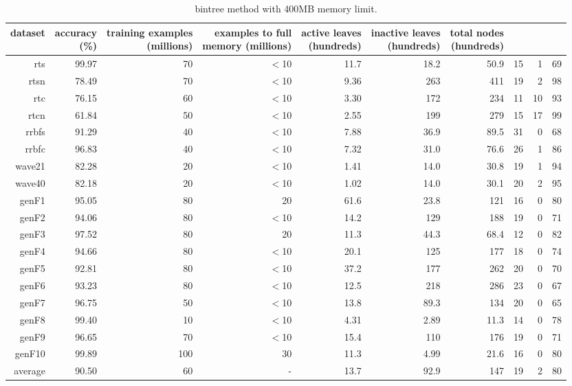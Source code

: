 \clearpage
\begin{table}
\caption{{\sc bintree} method with 400MB memory limit.}
\label{tab:bintree-400MB}
\centering
\begin{tabular}{|r|r|r|r|r|r|r|r|r|r|}
\hline
dataset	&
\rotatebox{90}{\parbox{9em}{accuracy\\(\%)}} &
\rotatebox{90}{\parbox{9em}{training examples\\(millions)}} &
\rotatebox{90}{\parbox{9em}{examples to full\\memory (millions)}} &
\rotatebox{90}{\parbox{9em}{active leaves\\(hundreds)}} &
\rotatebox{90}{\parbox{9em}{inactive leaves\\(hundreds)}} &
\rotatebox{90}{\parbox{9em}{total nodes\\(hundreds)}} &
\rotatebox{90}{\parbox{9em}{tree depth}}	&
\rotatebox{90}{\parbox{9em}{training speed (\%)}} &
\rotatebox{90}{\parbox{9em}{prediction speed (\%)}} \\
\hline
{\sc rts} & 99.97 & 70 & $<$10 & 11.7 & 18.2 & 50.9 & 15 & 1 & 69 \\
{\sc rtsn} & 78.49 & 70 & $<$10 & 9.36 & 263 & 411 & 19 & 2 & 98 \\
{\sc rtc} & 76.15 & 60 & $<$10 & 3.30 & 172 & 234 & 11 & 10 & 93 \\
{\sc rtcn} & 61.84 & 50 & $<$10 & 2.55 & 199 & 279 & 15 & 17 & 99 \\
{\sc rrbfs} & 91.29 & 40 & $<$10 & 7.88 & 36.9 & 89.5 & 31 & 0 & 68 \\
{\sc rrbfc} & 96.83 & 40 & $<$10 & 7.32 & 31.0 & 76.6 & 26 & 1 & 86 \\
{\sc wave21} & 82.28 & 20 & $<$10 & 1.41 & 14.0 & 30.8 & 19 & 1 & 94 \\
{\sc wave40} & 82.18 & 20 & $<$10 & 1.02 & 14.0 & 30.1 & 20 & 2 & 95 \\
{\sc genF1} & 95.05 & 80 & 20 & 61.6 & 23.8 & 121 & 16 & 0 & 80 \\
{\sc genF2} & 94.06 & 80 & $<$10 & 14.2 & 129 & 188 & 19 & 0 & 71 \\
{\sc genF3} & 97.52 & 80 & 20 & 11.3 & 44.3 & 68.4 & 12 & 0 & 82 \\
{\sc genF4} & 94.66 & 80 & $<$10 & 20.1 & 125 & 177 & 18 & 0 & 74 \\
{\sc genF5} & 92.81 & 80 & $<$10 & 37.2 & 177 & 262 & 20 & 0 & 70 \\
{\sc genF6} & 93.23 & 80 & $<$10 & 12.5 & 218 & 286 & 23 & 0 & 67 \\
{\sc genF7} & 96.75 & 50 & $<$10 & 13.8 & 89.3 & 134 & 20 & 0 & 65 \\
{\sc genF8} & 99.40 & 10 & $<$10 & 4.31 & 2.89 & 11.3 & 14 & 0 & 78 \\
{\sc genF9} & 96.65 & 70 & $<$10 & 15.4 & 110 & 176 & 19 & 0 & 71 \\
{\sc genF10} & 99.89 & 100 & 30 & 11.3 & 4.99 & 21.6 & 16 & 0 & 80 \\
\hline
average & 90.50 & 60 &  -  & 13.7 & 92.9 & 147 & 19 & 2 & 80 \\
\hline
\end{tabular}
\end{table}

